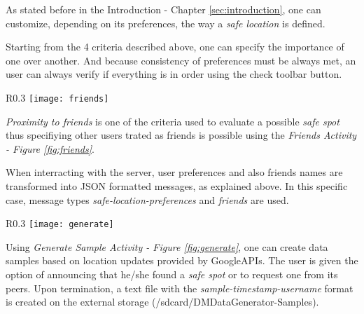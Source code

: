 As stated before in the Introduction - Chapter \ref{sec:introduction}, one can customize, depending on its preferences, the way a \textit{safe location} is defined.

Starting from the 4 criteria described above, one can specify the importance of one over another. And because consistency of preferences must be always met, an user can always verify if everything is in order using the check toolbar button.

\begin{wrapfigure}{R}{0.3\textwidth}
\centering
\texttt{[image: friends]}
\caption{\label{fig:friends}Friends Activity}
\end{wrapfigure}

\textit{Proximity to friends} is one of the criteria used to evaluate a possible \textit{safe spot} thus specifiying other users trated as friends is possible using the \textit{Friends Activity - Figure \ref{fig:friends}}.

When interracting with the server, user preferences and also friends names are transformed into JSON formatted messages, as explained above. In this specific case, message types \textit{safe-location-preferences} and \textit{friends} are used.

\begin{wrapfigure}{R}{0.3\textwidth}
\centering
\texttt{[image: generate]}
\caption{\label{fig:generate}Generate Sample Activity}
\end{wrapfigure}

Using \textit{Generate Sample Activity - Figure \ref{fig:generate}}, one can create data samples based on location updates provided by GoogleAPIs. The user is given the option of announcing that he/she found a \textit{safe spot} or to request one from its peers. Upon termination, a text file with the \textit{sample-timestamp-username} format is created on the external storage (/sdcard/DMDataGenerator-Samples).




